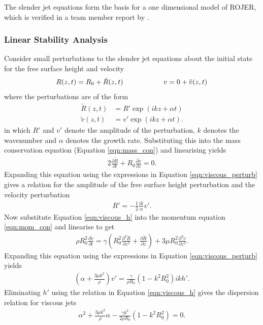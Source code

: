 \documentclass[11pt]{article}
\newcommand{\pd}[2]{\frac{\partial #1}{\partial #2}}
\newcommand{\pdtwo}[2]{\frac{\partial ^2 #1}{\partial #2 ^2}}
\newcommand{\pdthree}[2]{\frac{\partial ^3 #1}{\partial #2 ^3}}
\begin{document}
The slender jet equations form the basis for a one dimensional model of ROJER, which is verified in a team member report by \cite{hall2015report}.

\subsubsection{Linear Stability Analysis}
Consider small perturbations to the slender jet equations about the initial state for the free surface height and velocity
\begin{align*}
R(z,t) = R_0+ \tilde{R}(z,t) \hspace*{2cm} v = 0 + \tilde{v}(z,t)
\end{align*}
where the perturbations are of the form
\begin{align}
\tilde{R}(z,t) &= R' \exp(ikz + \alpha t) \nonumber \\
\tilde{v}(z,t) &= v' \exp(ikz + \alpha t).
\label{eqn:viscous_perturb}
\end{align}
in which $R'$ and $v'$ denote the amplitude of the perturbation, $k$ denotes the wavenumber and $\alpha$ denotes the growth rate. Substituting this into the mass conservation equation (Equation \ref{eqn:mass_con}) and linearising yields 
\begin{align}
2 \pd{\tilde{R}}{t} + R_0 \pd{\tilde{v}}{z} = 0.
\end{align}
Expanding this equation using the expressions in Equation \ref{eqn:viscous_perturb} gives a relation for the amplitude of the free surface height perturbation and the velocity perturbation
\begin{align}
R' = -\frac{1}{2} \frac{ik}{\alpha} v'.
\label{eqn:viscous_h}
\end{align}
Now substitute Equation \ref{eqn:viscous_h} into the momentum equation \ref{eqn:mom_con} and linearise to get
\begin{align*}
\rho R_0^2 \pd{\tilde{v}}{t} = \gamma \left( R_0^2 \pdthree{\tilde{R}}{z} + \pd{\tilde{R}}{z} \right) + 3 \mu R_0^2 \pdtwo{\tilde{v}}{z}.
\end{align*}
Expanding this equation using the expressions in Equation \ref{eqn:viscous_perturb} yields
\begin{align*}
\left(\alpha + \frac{3 \mu k^2}{\rho} \right) v' = \frac{\gamma}{\rho R_0}(1 - k^2 R_0^2) i k h'.
\end{align*}
Eliminating $h'$ using the relation in Equation \ref{eqn:viscous_h} gives the dispersion relation for viscous jets
\begin{align}
\alpha^2 + \frac{3 \mu k^2}{\rho}\alpha - \frac{\gamma k^2}{2 \rho R_0}(1 - k^2R_0^2) = 0.
\label{eqn:dispersion_viscous}
\end{align}
\end{document}
